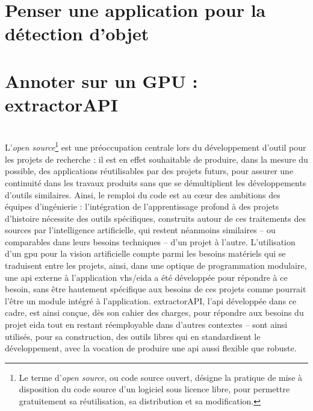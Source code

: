 \documentclass[a4paper,12pt,twoside]{book}
\newcommand{\api}{\gls{api}\xspace}
\newcommand{\eida}{\gls{eida}\xspace}
\newcommand{\exapi}{extractorAPI\xspace}
\newcommand{\gpu}{\gls{gpu}\xspace}
\newcommand{\ia}{intelligence artificielle\xspace}
\newcommand{\vhs}{\gls{vhs}\xspace}
\newcommand{\clearemptydoublepage}{\newpage{\pagestyle{empty}\cleardoublepage}}
\begin{document}
            \section{\label{detectionApp}Penser une application pour la détection d'objet}
                
        
            \section{Annoter sur un GPU : extractorAPI}
                
        	\\
        
        L'\textit{open source}\footnote{Le terme d'\textit{open source}, ou code source ouvert, désigne la pratique de mise à disposition du code source d'un logiciel sous licence libre, pour permettre gratuitement sa réutilisation, sa distribution et sa modification.} est une préoccupation centrale lors du développement d'outil pour les projets de recherche : il est en effet souhaitable de produire, dans la mesure du possible, des applications réutilisables par des projets futurs, pour assurer une continuité dans les travaux produits sans que se démultiplient les développements d'outils similaires. Ainsi, le remploi du code est au cœur des ambitions des équipes d'ingénierie : l'intégration de l'apprentissage profond à des projets d'histoire nécessite des outils spécifiques, construits autour de ces traitements des sources par l'\ia, qui restent néanmoins similaires -- ou comparables dans leurs besoins techniques -- d'un projet à l'autre. L'utilisation d'un \gpu pour la vision artificielle compte parmi les besoins matériels qui se traduisent entre les projets, ainsi, dans une optique de programmation modulaire, une \api externe à l'application \vhs/\eida a été développée pour répondre à ce besoin, sans être hautement spécifique aux besoins de ces projets comme pourrait l'être un module intégré à l'application. \exapi, l'\api développée dans ce cadre, est ainsi conçue, dès son cahier des charges, pour répondre aux besoins du projet \eida tout en restant réemployable dans d'autres contextes -- sont ainsi utilisés, pour sa construction, des outils libres qui en standardisent le développement, avec la vocation de produire une \api aussi flexible que robuste.
        \clearemptydoublepage
            
\end{document}
